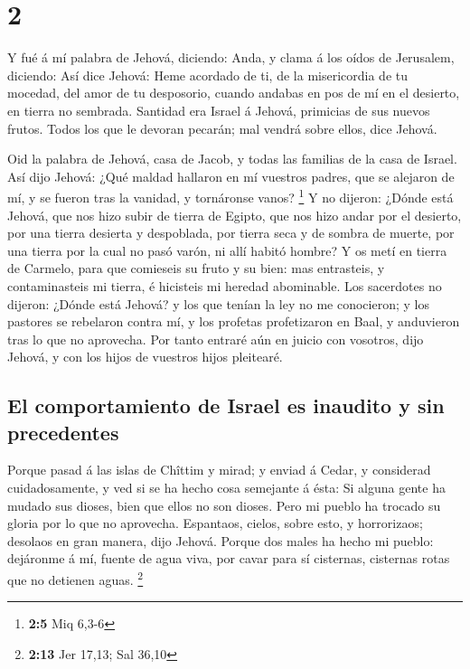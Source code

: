 \hypertarget{section-1}{%
\section{2}\label{section-1}}

 Y fué á mí palabra de Jehová, diciendo:  Anda,
y clama á los oídos de Jerusalem, diciendo: Así dice Jehová: Heme
acordado de ti, de la misericordia de tu mocedad, del amor de tu
desposorio, cuando andabas en pos de mí en el desierto, en tierra no
sembrada.  Santidad era Israel á Jehová, primicias de sus
nuevos frutos. Todos los que le devoran pecarán; mal vendrá sobre ellos,
dice Jehová.

 Oid la palabra de Jehová, casa de Jacob, y todas las
familias de la casa de Israel.  Así dijo Jehová: ¿Qué maldad
hallaron en mí vuestros padres, que se alejaron de mí, y se fueron tras
la vanidad, y tornáronse vanos? \footnote{\textbf{2:5} Miq 6,3-6}
 Y no dijeron: ¿Dónde está Jehová, que nos hizo subir de
tierra de Egipto, que nos hizo andar por el desierto, por una tierra
desierta y despoblada, por tierra seca y de sombra de muerte, por una
tierra por la cual no pasó varón, ni allí habitó hombre?  Y
os metí en tierra de Carmelo, para que comieseis su fruto y su bien: mas
entrasteis, y contaminasteis mi tierra, é hicisteis mi heredad
abominable.  Los sacerdotes no dijeron: ¿Dónde está Jehová?
y los que tenían la ley no me conocieron; y los pastores se rebelaron
contra mí, y los profetas profetizaron en Baal, y anduvieron tras lo que
no aprovecha.  Por tanto entraré aún en juicio con vosotros,
dijo Jehová, y con los hijos de vuestros hijos pleitearé.

\hypertarget{el-comportamiento-de-israel-es-inaudito-y-sin-precedentes}{%
\subsection{El comportamiento de Israel es inaudito y sin
precedentes}\label{el-comportamiento-de-israel-es-inaudito-y-sin-precedentes}}

 Porque pasad á las islas de Chîttim y mirad; y enviad á
Cedar, y considerad cuidadosamente, y ved si se ha hecho cosa semejante
á ésta:  Si alguna gente ha mudado sus dioses, bien que
ellos no son dioses. Pero mi pueblo ha trocado su gloria por lo que no
aprovecha.  Espantaos, cielos, sobre esto, y horrorizaos;
desolaos en gran manera, dijo Jehová.  Porque dos males ha
hecho mi pueblo: dejáronme á mí, fuente de agua viva, por cavar para sí
cisternas, cisternas rotas que no detienen aguas. \footnote{\textbf{2:13}
  Jer 17,13; Sal 36,10}

